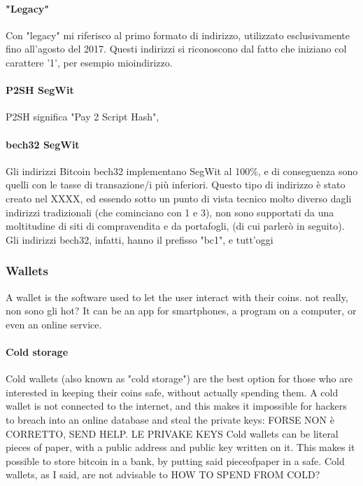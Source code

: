 \documentclass {article}
\begin{document}
\paragraph {"Legacy"}


Con "legacy" mi riferisco al primo formato di indirizzo, utilizzato esclusivamente fino all'agosto del 2017.
Questi indirizzi si riconoscono dal fatto che iniziano col carattere '1', per esempio mioindirizzo.


\paragraph {P2SH SegWit}


P2SH significa "Pay 2 Script Hash", 


\paragraph {bech32 SegWit}


Gli indirizzi Bitcoin bech32 implementano SegWit al 100\%, e di conseguenza sono quelli con le tasse di transazione/i più inferiori.
Questo tipo di indirizzo è stato creato nel XXXX, ed essendo sotto un punto di vista tecnico molto diverso dagli indirizzi tradizionali (che cominciano con 1 e 3), non sono supportati da una moltitudine di siti di compravendita e da portafogli, (di cui parlerò in seguito).
Gli indirizzi bech32, infatti, hanno il prefisso "bc1", e tutt'oggi 

\subsubsection {Wallets}


A wallet is the software used to let the user interact with their coins. not really, non sono gli hot?
It can be an app for smartphones, a program on a computer, or even an online service.


\paragraph {Cold storage}


Cold wallets (also known as "cold storage") are the best option for those who are interested in keeping their coins safe, without actually spending them.
A cold wallet is not connected to the internet, and this makes it impossible for hackers to breach into an online database and steal the private keys: FORSE NON è CORRETTO, SEND HELP. LE PRIVAKE KEYS 
Cold wallets can be literal pieces of paper, with a public address and public key written on it. This makes it possible to store bitcoin in a bank, by putting said pieceofpaper in a safe.
Cold wallets, as I said, are not advisable to HOW TO SPEND FROM COLD?
\end{document}
